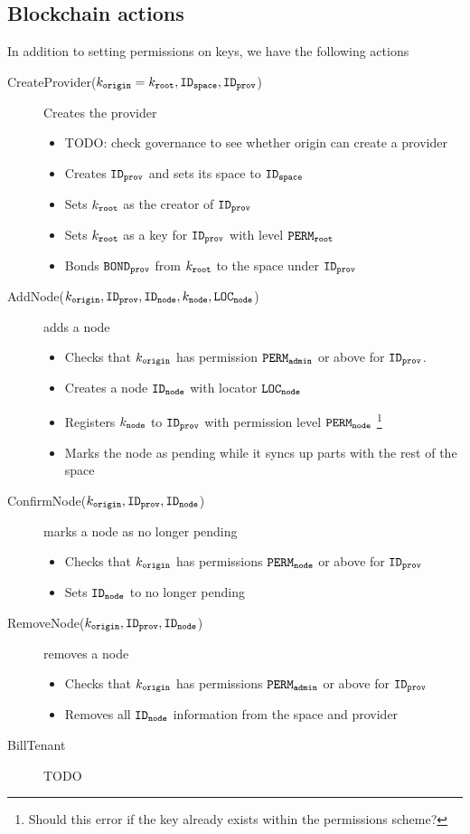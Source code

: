 \documentclass{article}
\begin{document}
\subsection{Blockchain actions}
In addition to setting permissions on keys, we have the following actions
\begin{description}
  \item[CreateProvider($k_\mathtt{origin} = k_\mathtt{root}, \mathtt{ID_{space}}, \mathtt{ID_{prov}}$)] Creates the provider
    \begin{itemize}
      \item TODO: check governance to see whether origin can create a provider
      \item Creates $\mathtt{ID_{prov}}$ and sets its space to $\mathtt{ID_{space}}$
      \item Sets $k_\mathtt{root}$ as the creator of $\mathtt{ID_{prov}}$
      \item Sets $k_\mathtt{root}$ as a key for $\mathtt{ID_{prov}}$ with level $\mathtt{PERM_{root}}$
      \item Bonds $\mathtt{BOND_{prov}}$ from $k_\mathtt{root}$ to the space under $\mathtt{ID_{prov}}$
    \end{itemize}
  \item[AddNode($k_\mathtt{origin}, \mathtt{ID_{prov}}, \mathtt{ID_{node}}, k_\mathtt{node}, \mathtt{LOC_{node}}$)] adds a node
    \begin{itemize}
      \item Checks that $k_\mathtt{origin}$ has permission $\mathtt{PERM_{admin}}$ or above for $\mathtt{ID_{prov}}$.
      \item Creates a node $\mathtt{ID_{node}}$ with locator $\mathtt{LOC_{node}}$
      \item Registers $k_\mathtt{node}$ to $\mathtt{ID_{prov}}$ with permission level $\mathtt{PERM_{node}}$ \footnote{Should this error if the key already exists within the permissions scheme?}
      \item Marks the node as pending while it syncs up parts with the rest of the space
    \end{itemize}
  \item[ConfirmNode($k_\mathtt{origin}, \mathtt{ID_{prov}}, \mathtt{ID_{node}}$)] marks a node as no longer pending
    \begin{itemize}
      \item Checks that $k_\mathtt{origin}$ has permissions $\mathtt{PERM_{node}}$ or above for $\mathtt{ID_{prov}}$
      \item Sets $\mathtt{ID_{node}}$ to no longer pending
    \end{itemize}
  \item[RemoveNode($k_\mathtt{origin}, \mathtt{ID_{prov}}, \mathtt{ID_{node}}$)] removes a node
    \begin{itemize}
      \item Checks that $k_\mathtt{origin}$ has permissions $\mathtt{PERM_{admin}}$ or above for $\mathtt{ID_{prov}}$
      \item Removes all $\mathtt{ID_{node}}$ information from the space and provider
    \end{itemize}
  \item[BillTenant] TODO
\end{description}
\end{document}

